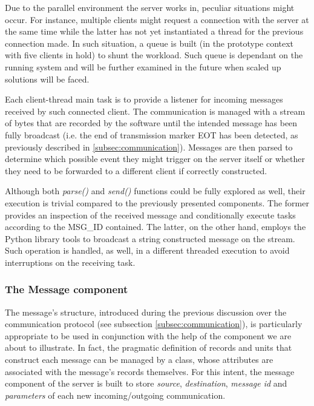 \medskip
Due to the parallel environment the server works in, peculiar situations might occur. For instance, multiple clients might request a connection with the server at the same time while the latter has not yet instantiated a thread for the previous connection made. In such situation, a queue is built (in the prototype context with five clients in hold) to shunt the workload. Such queue is dependant on the running system and will be further examined in the future when scaled up solutions will be faced.

\vspace{0.5cm}

\vspace{0.5cm}

Each client-thread main task is to provide a listener for incoming messages received by such connected client. The communication is managed with a stream of bytes that are recorded by the software until the intended message has been fully broadcast (i.e. the end of transmission marker EOT has been detected, as previously described in \ref{subsec:communication}). Messages are then parsed to determine which possible event they might trigger on the server itself or whether they need to be forwarded to a different client if correctly constructed.

\vspace{0.5cm}

\vspace{0.5cm}

Although both \textit{parse()} and \textit{send()} functions could be fully explored as well, their execution is trivial compared to the previously presented components. The former provides an inspection of the received message and conditionally execute tasks according to the MSG\_ID contained. The latter, on the other hand, employs the Python library tools to broadcast a string constructed message on the stream. Such operation is handled, as well, in a different threaded execution to avoid interruptions on the receiving task.

\newpage
\subsubsection{The Message component}
The message's structure, introduced during the previous discussion over the communication protocol (see subsection \ref{subsec:communication}), is particularly appropriate to be used in conjunction with the help of the component we are about to illustrate. In fact, the pragmatic definition of records and units that construct each message can be managed by a class, whose attributes are associated with the message's records themselves. For this intent, the message component of the server is built to store \textit{source}, \textit{destination}, \textit{message id} and \textit{parameters} of each new incoming/outgoing communication.


